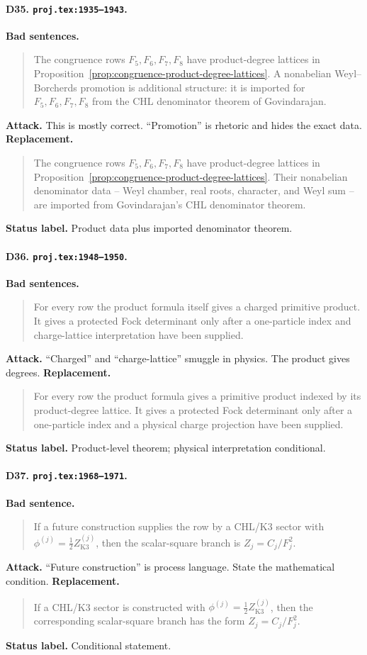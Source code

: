 \paragraph{D35. \texttt{proj.tex:1935--1943}.}
\textbf{Bad sentences.}
\begin{quote}\small
The congruence rows \(F_5,F_6,F_7,F_8\) have product-degree lattices in
Proposition~\ref{prop:congruence-product-degree-lattices}.  A nonabelian
Weyl--Borcherds promotion is additional structure: it is imported for
\(F_5,F_6,F_7,F_8\) from the CHL denominator theorem of Govindarajan.
\end{quote}
\textbf{Attack.}
This is mostly correct.  ``Promotion'' is rhetoric and hides the exact
data.
\textbf{Replacement.}
\begin{quote}\small
The congruence rows \(F_5,F_6,F_7,F_8\) have product-degree lattices in
Proposition~\ref{prop:congruence-product-degree-lattices}.  Their
nonabelian denominator data -- Weyl chamber, real roots, character, and
Weyl sum -- are imported from Govindarajan's CHL denominator theorem.
\end{quote}
\textbf{Status label.} Product data plus imported denominator theorem.

\paragraph{D36. \texttt{proj.tex:1948--1950}.}
\textbf{Bad sentences.}
\begin{quote}\small
For every row the product formula itself gives a charged primitive
product.  It gives a protected Fock determinant only after a one-particle
index and charge-lattice interpretation have been supplied.
\end{quote}
\textbf{Attack.}
``Charged'' and ``charge-lattice'' smuggle in physics.  The product gives
degrees.
\textbf{Replacement.}
\begin{quote}\small
For every row the product formula gives a primitive product indexed by
its product-degree lattice.  It gives a protected Fock determinant only
after a one-particle index and a physical charge projection have been
supplied.
\end{quote}
\textbf{Status label.} Product-level theorem; physical interpretation
conditional.

\paragraph{D37. \texttt{proj.tex:1968--1971}.}
\textbf{Bad sentence.}
\begin{quote}\small
If a future construction supplies the row by a CHL/K3 sector with
\(\phi^{(j)}=\tfrac12Z^{(j)}_{\mathrm{K3}}\), then the scalar-square
branch is \(Z_j=C_j/F_j^2\).
\end{quote}
\textbf{Attack.}
``Future construction'' is process language.  State the mathematical
condition.
\textbf{Replacement.}
\begin{quote}\small
If a CHL/K3 sector is constructed with
\(\phi^{(j)}=\tfrac12Z^{(j)}_{\mathrm{K3}}\), then the corresponding
scalar-square branch has the form \(Z_j=C_j/F_j^2\).
\end{quote}
\textbf{Status label.} Conditional statement.

